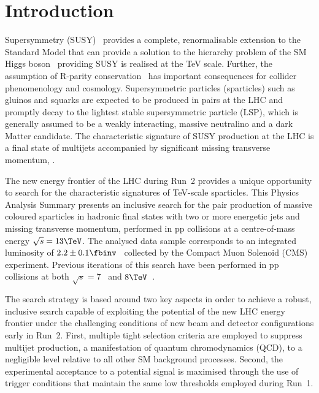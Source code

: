 \section{Introduction}
\label{sec:introduction}

Supersymmetry (SUSY)~\cite{ref:SUSY-1, ref:SUSY0, ref:SUSY1,
  ref:SUSY2, ref:SUSY3, ref:SUSY4, ref:hierarchy1, ref:hierarchy2}
provides a complete, renormalisable extension to the Standard Model
that can provide a solution to the hierarchy problem of the SM Higgs
boson~\cite{ref:atlashiggsdiscovery, ref:cmshiggsdiscovery} providing
SUSY is realised at the TeV scale. Further, the assumption of R-parity
conservation~\cite{Farrar:1978xj} has important consequences for
collider phenomenology and cosmology. Supersymmetric particles
(sparticles) such as gluinos and squarks are expected to be produced
in pairs at the LHC and promptly decay to the lightest stable
supersymmetric particle (LSP), which is generally assumed to be a
weakly interacting, massive neutralino and a dark Matter
candidate. The characteristic signature of SUSY production at the LHC
is a final state of multijets accompanied by significant missing
transverse momentum, \ptvecmiss.

The new energy frontier of the LHC during Run~2 provides a unique
opportunity to search for the characteristic signatures of TeV-scale
sparticles. This Physics Analysis Summary presents an inclusive search
for the pair production of massive coloured sparticles in hadronic
final states with two or more energetic jets and missing transverse
momentum, performed in pp collisions at a centre-of-mass energy
$\sqrt{s} = 13\TeV$. The analysed data sample corresponds to an
integrated luminosity of $2.2 \pm 0.1 \fbinv$~\cite{lumi} collected by
the Compact Muon Solenoid (CMS) experiment. Previous iterations of
this search have been performed in pp collisions at both $\sqrt{s} =
7$~\cite{RA1Paper, RA1Paper2011, RA1Paper2011FULL} and
$8\TeV$~\cite{RA1Paper2012}.

The search strategy is based around two key aspects in order to
achieve a robust, inclusive search capable of exploiting the potential
of the new LHC energy frontier under the challenging conditions of new
beam and detector configurations early in Run~2. First, multiple tight
selection criteria are employed to suppress multijet production, a
manifestation of quantum chromodynamics (QCD), to a negligible level
relative to all other SM background processes. Second, the
experimental acceptance to a potential signal is maximised through the
use of trigger conditions that maintain the same low thresholds
employed during Run~1.

